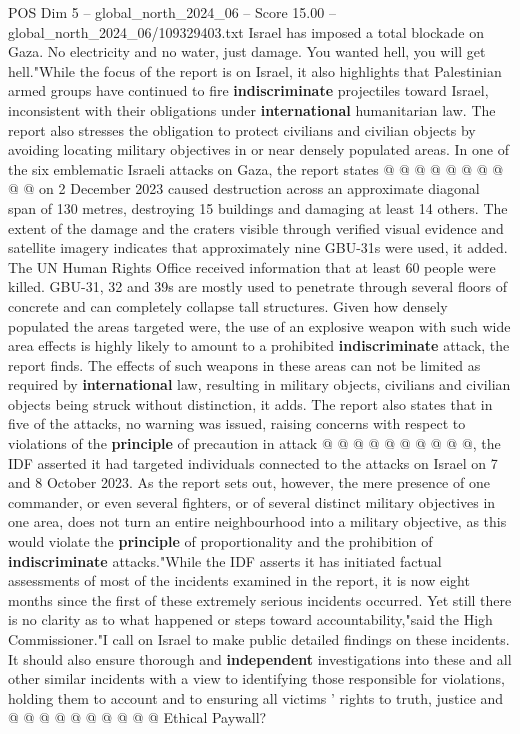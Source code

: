 \begin{textsample}{POS Dim 5 – global\_north\_2024\_06 – Score 15.00 – global\_north\_2024\_06/109329403.txt}
Israel has imposed a total blockade on Gaza.
No electricity and no water, just damage.
You wanted hell, you will get hell."While the focus of the report is on Israel, it also highlights that Palestinian armed groups have continued to fire \textbf{indiscriminate} projectiles toward Israel, inconsistent with their obligations under \textbf{international} humanitarian law.
The report also stresses the obligation to protect civilians and civilian objects by avoiding locating military objectives in or near densely populated areas.
In one of the six emblematic Israeli attacks on Gaza, the report states @ @ @ @ @ @ @ @ @ @ on 2 December 2023 caused destruction across an approximate diagonal span of 130 metres, destroying 15 buildings and damaging at least 14 others.
The extent of the damage and the craters visible through verified visual evidence and satellite imagery indicates that approximately nine GBU-31s were used, it added.
The UN Human Rights Office received information that at least 60 people were killed.
GBU-31, 32 and 39s are mostly used to penetrate through several floors of concrete and can completely collapse tall structures.
Given how densely populated the areas targeted were, the use of an explosive weapon with such wide area effects is highly likely to amount to a prohibited \textbf{indiscriminate} attack, the report finds.
The effects of such weapons in these areas can not be limited as required by \textbf{international} law, resulting in military objects, civilians and civilian objects being struck without distinction, it adds.
The report also states that in five of the attacks, no warning was issued, raising concerns with respect to violations of the \textbf{principle} of precaution in attack @ @ @ @ @ @ @ @ @ @, the IDF asserted it had targeted individuals connected to the attacks on Israel on 7 and 8 October 2023.
As the report sets out, however, the mere presence of one commander, or even several fighters, or of several distinct military objectives in one area, does not turn an entire neighbourhood into a military objective, as this would violate the \textbf{principle} of proportionality and the prohibition of \textbf{indiscriminate} attacks."While the IDF asserts it has initiated factual assessments of most of the incidents examined in the report, it is now eight months since the first of these extremely serious incidents occurred.
Yet still there is no clarity as to what happened or steps toward accountability,"said the High Commissioner."I call on Israel to make public detailed findings on these incidents.
It should also ensure thorough and \textbf{independent} investigations into these and all other similar incidents with a view to identifying those responsible for violations, holding them to account and to ensuring all victims ' rights to truth, justice and @ @ @ @ @ @ @ @ @ @ Ethical Paywall?

\end{textsample}
